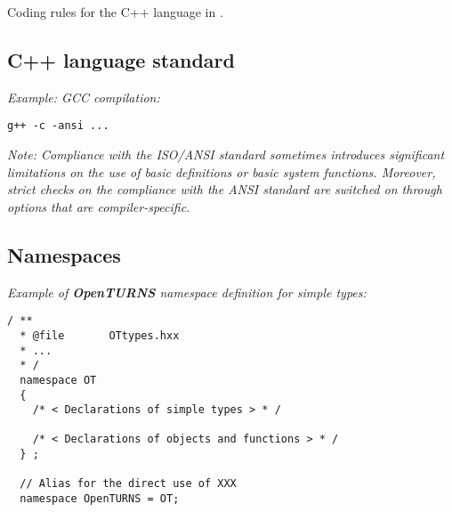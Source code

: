 
Coding rules for the C++ language in \OT.

\subsection{C++ language standard}

\emph{Example: GCC compilation:}
\lstset{language=C++, basicstyle=\normalsize}
\begin{lstlisting}[frame=TRBL]
  g++ -c -ansi ...
\end{lstlisting}
\emph{Note: Compliance with the ISO/ANSI standard sometimes introduces significant limitations on the use of basic definitions or basic system functions. Moreover, strict checks on the compliance with the ANSI standard are switched on through options that are compiler-specific.}

\subsection{Namespaces}

\emph{Example of {\bf OpenTURNS} namespace definition for simple types:}
\lstset{language=C++, basicstyle=\normalsize}
\begin{lstlisting}[frame=TBRL]
  / **
  * @file       OTtypes.hxx
  * ...
  * /
  namespace OT
  {
    /* < Declarations of simple types > * /

    /* < Declarations of objects and functions > * /
  } ;

  // Alias for the direct use of XXX
  namespace OpenTURNS = OT;
\end{lstlisting}

